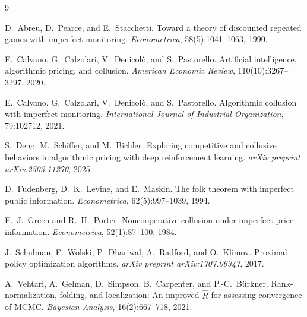 \documentclass{article}
\begin{document}

\begin{thebibliography}{9}

D.~Abreu, D.~Pearce, and E.~Stacchetti.
\newblock Toward a theory of discounted repeated games with imperfect
  monitoring.
\newblock \emph{Econometrica}, 58(5):1041--1063, 1990.

E.~Calvano, G.~Calzolari, V.~Denicol\`o, and S.~Pastorello.
\newblock Artificial intelligence, algorithmic pricing, and collusion.
\newblock \emph{American Economic Review}, 110(10):3267--3297, 2020.

E.~Calvano, G.~Calzolari, V.~Denicol\`o, and S.~Pastorello.
\newblock Algorithmic collusion with imperfect monitoring.
\newblock \emph{International Journal of Industrial Organization}, 79:102712,
  2021.

S.~Deng, M.~Schiffer, and M.~Bichler.
\newblock Exploring competitive and collusive behaviors in algorithmic
  pricing with deep reinforcement learning.
\newblock \emph{arXiv preprint arXiv:2503.11270}, 2025.

D.~Fudenberg, D.~K.~Levine, and E.~Maskin.
\newblock The folk theorem with imperfect public information.
\newblock \emph{Econometrica}, 62(5):997--1039, 1994.

E.~J.~Green and R.~H.~Porter.
\newblock Noncooperative collusion under imperfect price information.
\newblock \emph{Econometrica}, 52(1):87--100, 1984.

J.~Schulman, F.~Wolski, P.~Dhariwal, A.~Radford, and O.~Klimov.
\newblock Proximal policy optimization algorithms.
\newblock \emph{arXiv preprint arXiv:1707.06347}, 2017.

A.~Vehtari, A.~Gelman, D.~Simpson, B.~Carpenter, and P.-C.~B\"urkner.
\newblock Rank-normalization, folding, and localization: An improved
  $\hat{R}$ for assessing convergence of {MCMC}.
\newblock \emph{Bayesian Analysis}, 16(2):667--718, 2021.

\end{thebibliography}
\end{document}
